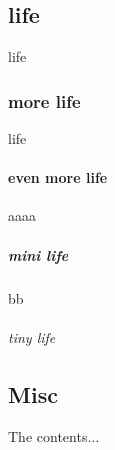 \documentclass{iyte}    %
\begin{document}
\section{life}
life

\subsection{more life}
life

\subsubsection{even more life}
aaaa

\paragraph{mini life}
bb

\subparagraph{tiny life}


\begin{thesisappendices}
	\chapter{Misc}
	The contents...
\end{thesisappendices}


%
%
\end{document}
